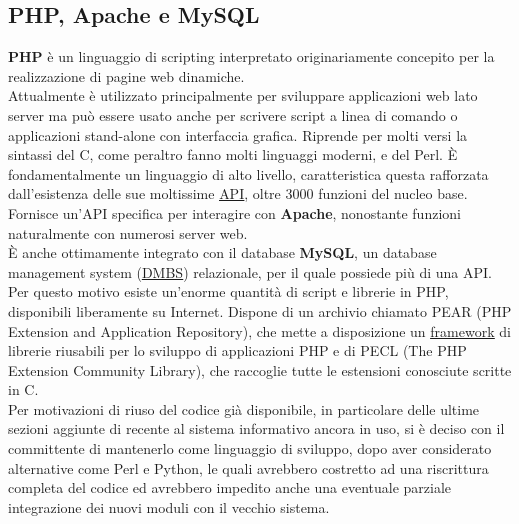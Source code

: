 \subsection{PHP, Apache e MySQL}
\textbf{PHP} \`e un linguaggio di scripting interpretato originariamente concepito per la realizzazione di pagine web dinamiche. \\
Attualmente \`e utilizzato principalmente per sviluppare applicazioni web lato server ma pu\`o essere usato anche per scrivere script a linea di comando o applicazioni stand-alone con interfaccia grafica. Riprende per molti versi la sintassi del C, come peraltro fanno molti linguaggi moderni, e del Perl. \`E fondamentalmente un linguaggio di alto livello, caratteristica questa rafforzata dall'esistenza delle sue moltissime \hyperlink{api}{\underline{API}}, oltre 3000 funzioni del nucleo base. \\
Fornisce un'API specifica per interagire con \textbf{Apache}, nonostante funzioni naturalmente con numerosi server web.\\
\`E anche ottimamente integrato con il database \textbf{MySQL}, un database management system (\hyperlink{dbms}{\underline{DMBS}}) relazionale, per il quale possiede pi\`u di una API. \\
Per questo motivo esiste un'enorme quantit\`a di script e librerie in PHP, disponibili liberamente su Internet. Dispone di un archivio chiamato PEAR (PHP Extension and Application Repository), che mette a disposizione un \hyperlink{framework}{\underline{framework}} di librerie riusabili per lo sviluppo di applicazioni PHP e di PECL (The PHP Extension Community Library), che raccoglie tutte le estensioni conosciute scritte in C. \\
Per motivazioni di riuso del codice gi\`a disponibile, in particolare delle ultime sezioni aggiunte di recente al sistema informativo ancora in uso, si \`e deciso con il committente di mantenerlo come linguaggio di sviluppo, dopo aver considerato alternative come Perl e Python, le quali avrebbero costretto ad una riscrittura completa del codice ed avrebbero impedito anche una eventuale parziale integrazione dei nuovi moduli con il vecchio sistema.

